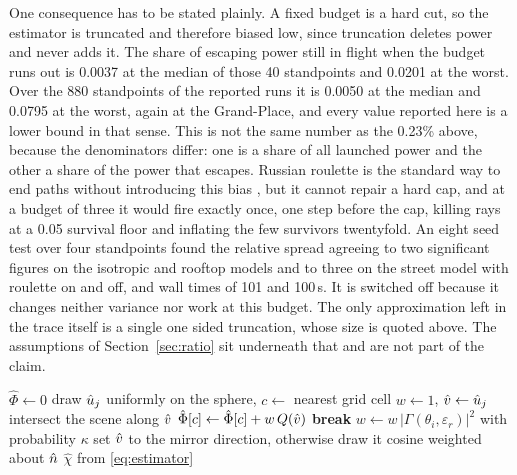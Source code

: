 One consequence has to be stated plainly. A fixed budget is a hard cut, so the
estimator is truncated and therefore biased low, since truncation deletes power
and never adds it. The share of escaping power still in flight when the budget
runs out is 0.0037 at the median of those 40 standpoints and 0.0201 at the
worst. Over the 880 standpoints of the reported runs it is 0.0050 at the median
and 0.0795 at the worst, again at the Grand-Place, and every
value reported here is a lower bound in that sense. This is not the same number
as the 0.23\% above, because the denominators differ: one is a share of all
launched power and the other a share of the power that escapes. Russian roulette is the
standard way to end paths without introducing this bias \cite{arvokirk}, but it
cannot repair a hard cap, and at a budget of three it would fire exactly once,
one step before the cap, killing rays at a 0.05 survival floor and inflating the
few survivors twentyfold. An eight seed test over four standpoints found the
relative spread agreeing to two significant figures on the isotropic and rooftop
models and to three on the street model with roulette on and off, and wall times
of 101 and 100\,s. It is switched off because it changes neither variance nor
work at this budget. The only approximation left in the trace itself is a single one sided
truncation, whose size is quoted above. The assumptions of
Section~\ref{sec:ratio} sit underneath that and are not part of the claim.

\begin{algorithm}[!t]
\caption{Adjoint trace at one standpoint}
\label{alg:trace}
\begin{algorithmic}[1]
\State $\hat{\Phi} \gets 0$
  \State draw $\hat{u}_j$ uniformly on the sphere, $c \gets$ nearest grid cell
  \State $w \gets 1$, $\hat{v} \gets \hat{u}_j$
    \State intersect the scene along $\hat{v}$
      \State $\hat{\Phi}[c] \gets \hat{\Phi}[c] + w\,Q(\hat{v})$
      \State \textbf{break}
    \EndIf
    \State $w \gets w \, |\Gamma(\theta_i, \varepsilon_r)|^2$
    \State with probability $\kappa$ set $\hat{v}$ to the mirror direction,
    \Statex \hspace{\algorithmicindent} otherwise draw it cosine weighted about $\hat{n}$
  \EndFor
  \State {}
\EndFor
\State \Return $\hat{\chi}$ from \eqref{eq:estimator}
\end{algorithmic}
\end{algorithm}

